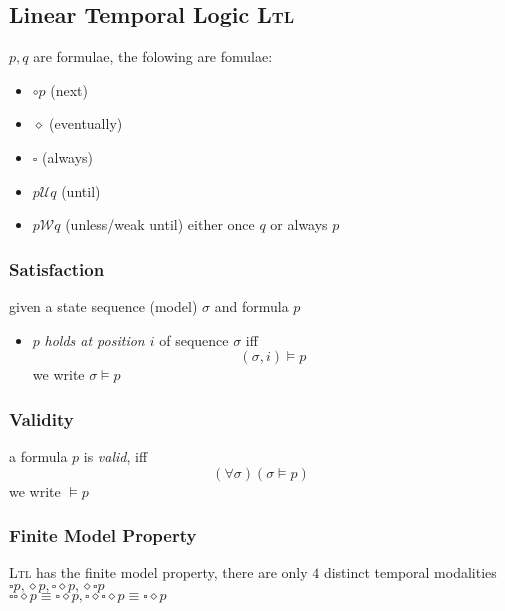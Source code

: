 \documentclass[a4paper, 10pt]{article}
\begin{document}
\subsection*{Linear Temporal Logic \textsc{Ltl}}
$p,q$ are formulae, the folowing are fomulae:
\begin{itemize}
    \item $\circ p$ (next)
    \item $\diamond$ (eventually)
    \item $\square$ (always)
    \item $p \mathcal{U}q$ (until)
    \item $p \mathcal{W}q$ (unless/weak until) {\tiny either once $q$ or always $p$}
\end{itemize}
\subsubsection*{Satisfaction}
given a state sequence (model) $\sigma$ and formula $p$
\begin{itemize}
    \item $p$ \emph{holds at position $i$} of sequence $\sigma$ iff \[ (\sigma,i) \models p \] we write $\sigma\models p$
\end{itemize}
\subsubsection*{Validity}
a formula $p$ is \emph{valid}, iff \[ (\forall\sigma)(\sigma\models p) \] we write $\models p$
\subsubsection*{Finite Model Property}
\textsc{Ltl} has the finite model property, there are only $4$ distinct temporal modalities \\
$\square p, \diamond p, \square\diamond p, \diamond\square p$ \\
$\square\square\diamond p\equiv\square\diamond p, \square\diamond\square\diamond p\equiv\square\diamond p$
\end{document}

